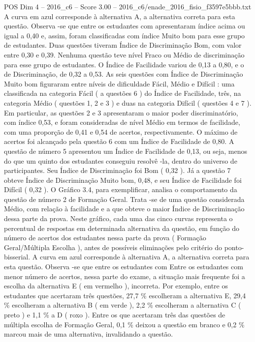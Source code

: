 \begin{textsample}{POS Dim 4 – 2016\_c6 – Score 3.00 – 2016\_c6/enade\_2016\_fisio\_f3597e5bbb.txt}
A curva em azul corresponde à alternativa A, a alternativa correta para esta questão.
Observa -se que entre os estudantes com apresentaram índice acima ou igual a 0,40 e, assim, foram classificadas com índice Muito bom para esse grupo de estudantes.
Duas questões tiveram Índice de Discriminação Bom, com valor entre 0,30 e 0,39.
Nenhuma questão teve nível Fraco ou Médio de discriminação para esse grupo de estudantes.
O Índice de Facilidade variou de 0,13 a 0,80, e o de Discriminação, de 0,32 a 0,53.
As seis questões com Índice de Discriminação Muito bom figuraram entre níveis de dificuldade Fácil, Médio e Difícil : uma classificada na categoria Fácil ( a questões 6 ) do Índice de Facilidade, três, na categoria Médio ( questões 1, 2 e 3 ) e duas na categoria Difícil ( questões 4 e 7 ).
Em particular, as questões 2 e 3 apresentaram o maior poder discriminatório, com índice 0,53, e foram consideradas de nível Médio em termos de facilidade, com uma proporção de 0,41 e 0,54 de acertos, respectivamente.
O máximo de acertos foi alcançado pela questão 6 com um Índice de Facilidade de 0,80.
A questão de número 5 apresentou um Índice de Facilidade de 0,13, ou seja, menos do que um quinto dos estudantes conseguiu resolvê -la, dentro do universo de participantes.
Seu Índice de Discriminação foi Bom ( 0,32 ).
Já a questão 7 obteve Índice de Discriminação Muito bom, 0,48, e seu Índice de Facilidade foi Difícil ( 0,32 ).
O Gráfico 3.4, para exemplificar, analisa o comportamento da questão de número 2 de Formação Geral.
Trata -se de uma questão considerada Médio, com relação à facilidade e a que obteve o maior Índice de Discriminação dessa parte da prova.
Neste gráfico, cada uma das cinco curvas representa o percentual de respostas em determinada alternativa da questão, em função do número de acertos dos estudantes nessa parte da prova ( Formação Geral/Múltipla Escolha ), antes de possíveis eliminações pelo critério do ponto-bisserial.
A curva em azul corresponde à alternativa A, a alternativa correta para esta questão.
Observa -se que entre os estudantes com Entre os estudantes com menor número de acertos, nessa parte do exame, a situação mais frequente foi a escolha da alternativa E ( em vermelho ), incorreta.
Por exemplo, entre os estudantes que acertaram três questões, 27,7 \% escolheram a alternativa E, 29,4 \% escolheram a alternativa B ( em verde ), 2,2 \% escolheram a alternativa C ( preto ) e 1,1 \% a D ( roxo ).
Entre os que acertaram três das questões de múltipla escolha de Formação Geral, 0,1 \% deixou a questão em branco e 0,2 \% marcou mais de uma alternativa, invalidando a questão.

\end{textsample}

